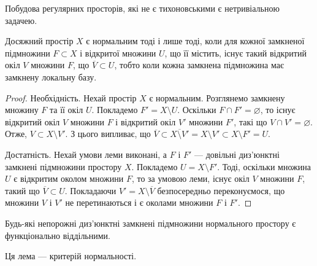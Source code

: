 \documentclass[a4paper, 12pt]{article}
\renewcommand{\emptyset}{\varnothing}
\begin{document}
\begin{remark}
	Побудова регулярних просторів, які не є
	тихоновськими є нетривіальною задачею.
\end{remark}

\begin{theorem}
	Досяжний простір $X$ є нормальним тоді і лише тоді, коли
	для кожної замкненої підмножини $F \subset X$ і відкритої
	множини $U$, що її містить, існує такий відкритий окіл $V$
	множини $F$, що $\overline{V} \subset U$, тобто коли кожна замкнена
	підмножина має замкнену локальну базу.
\end{theorem}

\begin{proof}
	Необхідність. Нехай простір $X$ є
	нормальним. Розглянемо замкнену множину $F$ та її окіл $U$.
	Покладемо $ F' = X \setminus U$. Оскільки $F \cap F' = \emptyset$, то існує
	відкритий окіл $V$ множини $F$ і відкритий окіл $V'$ множини
	$F'$,  такі що $V \cap V' = \emptyset$. Отже, $V \subset X \setminus V'$. З цього 
	випливає, що $\overline{V} \subset \overline{X \setminus V'} = X \setminus V' \subset X \setminus F' = U$. \smallskip

	Достатність. Нехай умови леми виконані, а $F$ і $F'$ ---
	довільні диз'юнктні замкнені підмножини простору $X$.
	Покладемо $U = X \setminus F'$. Тоді, оскільки множина $U$ є
	відкритим околом множини $F$, то за умовою леми, існує
	окіл $V$ множини $F$, такий що $\overline{V} \subset U$. Покладаючи
	$V' = X \setminus \overline{V}$ безпосередньо переконуємося, що множини $V$ і
	$V'$ не перетинаються і є околами множини $F$ і $F'$.
\end{proof}

\begin{theorem}
	Будь-які непорожні диз'юнктні
	замкнені підмножини нормального простору є
	функціонально віддільними.
\end{theorem}

\begin{remark}
    Ця лема --- критерій нормальності.
\end{remark}

\end{document}
